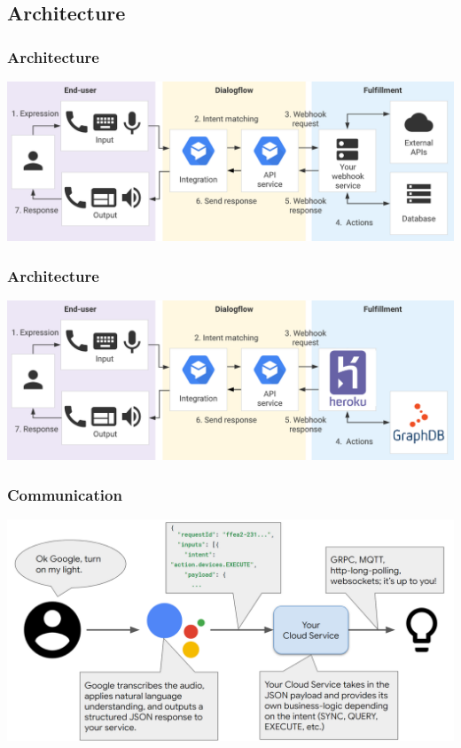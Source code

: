 \documentclass{beamer}
\begin{document}
\subsection{Architecture}

\begin{frame}
\frametitle{Architecture}
\begin{center}
\includegraphics[width=\textwidth]{pictures/fulfillment_flow.png} 
\end{center}
\end{frame}

\begin{frame}
\frametitle{Architecture}
\begin{center}
\includegraphics[width=\textwidth]{pictures/fulfillment_flow2.png} 
\end{center}
\end{frame}


\begin{frame}
\frametitle{Communication}
\begin{center}
\includegraphics[scale=0.22]{pictures/communication_btw.png}
\end{center}
\end{frame}
\end{document}
